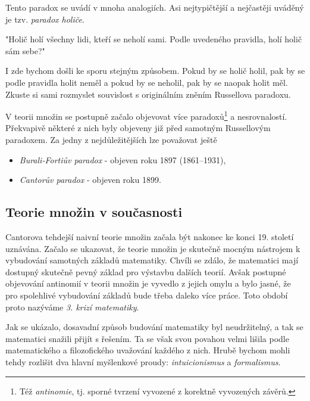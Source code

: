 Tento paradox se uvádí v mnoha analogiích. Asi nejtypičtější a nejčastěji uváděný je tzv. \emph{paradox holiče}.

"Holič holí všechny lidi, kteří se neholí sami. Podle uvedeného pravidla, holí holič sám sebe?"

I zde bychom došli ke sporu stejným způsobem. Pokud by se holič holil, pak by se podle pravidla holit neměl a pokud by se neholil, pak by se naopak holit měl. Zkuste si sami rozmyslet souvislost s originálním zněním Russellova paradoxu.\par
V teorii množin se postupně začalo objevovat více paradoxů\footnote{Též \emph{antinomie}, tj. sporné tvrzení vyvozené z korektně vyvozených závěrů.} a nesrovnalostí. Překvapivě některé z nich byly objeveny již před samotným Russellovým paradoxem. Za jedny z nejdůležitějších lze považovat ještě
\begin{itemize}
\item \emph{Burali-Fortiův paradox} - objeven roku 1897  (1861--1931),
\item \emph{Cantorův paradox} - objeven roku 1899.
\end{itemize}
\subsection{Teorie množin v současnosti}
\label{subsec:tm_soucasnost}
Cantorova tehdejší naivní teorie množin začala být nakonec ke konci 19. století uznávána. Začalo se ukazovat, že teorie množin je skutečně mocným nástrojem k vybudování samotných základů matematiky. Chvíli se zdálo, že matematici mají dostupný skutečně pevný základ pro výstavbu dalších teorií. Avšak postupné objevování antinomií v teorii množin je vyvedlo z jejich omylu a bylo jasné, že pro spolehlivé vybudování základů bude třeba daleko více práce. Toto období proto nazýváme \emph{3. krizí matematiky}.\par
Jak se ukázalo, dosavadní způsob budování matematiky byl neudržitelný, a tak se matematici snažili přijít s řešením. Ta se však svou povahou velmi lišila podle matematického a filozofického uvažování každého z nich. Hrubě bychom mohli tehdy rozlišit dva hlavní myšlenkové proudy: \emph{intuicionismus} a \emph{formalismus}.

